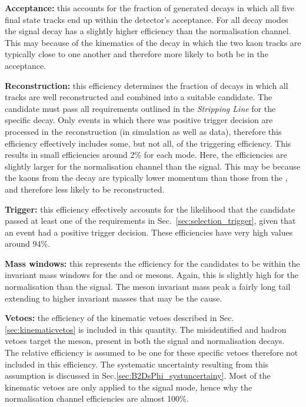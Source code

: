 \begin{description}

\item \textbf{Acceptance:} this accounts for the fraction of generated decays in which all five final state tracks end up within the \lhcb detector's acceptance. For all \Dsp decay modes the signal decay has a slightly higher efficiency than the normalisation channel. This may because of the kinematics of the \decay{\phiz}{\Kp\Km} decay in which the two kaon tracks are typically close to one another and therefore more likely to both be in the acceptance.   

\item \textbf{Reconstruction:} this efficiency determines the fraction of decays in which all tracks are well reconstructed and combined into a suitable candidate. 
The candidate must pass all requirements outlined in the \emph{Stripping Line} for the specific decay. 
Only events in which there was positive trigger decision are processed in the reconstruction (in simulation as well as data), therefore this efficiency effectively includes some, but not all, of the triggering efficiency.
This results in small efficiencies around 2\% for each mode. Here, the efficiencies are slightly larger for the normalisation channel than the signal. This may be because the kaons from the \phiz decay are typically lower momentum than those from the \Dzb, and therefore less likely to be reconstructed.  

\item \textbf{Trigger:} this efficiency effectively accounts for the likelihood that the candidate passed at least one of the requirements in Sec.~\ref{sec:selection_trigger}, given that an event had a positive trigger decision. These efficiencies have very high values around 94\%.  

\item \textbf{Mass windows:} this represents the efficiency for the candidates to be within the invariant mass windows for the \Dsp and \phiz or \Dzb mesons. Again, this is slightly high for the normalisation than the signal. The \phiz meson invariant mass peak a fairly long tail extending to higher invariant masses that may be the cause.  

\item \textbf{Vetoes:} the efficiency of the kinematic vetoes described in Sec.\ref{sec:kinematicvetos} is included in this quantity. The misidentified \D and \Lc hadron vetoes target the \Dsp meson, present in both the signal and normalisation decays. The relative efficiency is assumed to be one for these specific vetoes therefore not included in this efficiency. The systematic uncertainty resulting from this assumption is discussed in Sec.\ref{sec:B2DsPhi_systuncertainy}. Most of the kinematic vetoes are only applied to the signal mode, hence why the normalisation channel efficiencies are almost 100\%.


\end{description}
